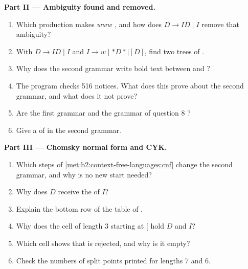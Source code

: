 \begin{problem}
\medskip\noindent\textbf{Part II --- Ambiguity found and removed.}\par\nopagebreak
\begin{enumerate}[resume, beginpenalty=10000]
\item Which production makes $www$ , and how does $D \to ID \mid I$ remove that ambiguity?
\item With $D \to ID \mid I$ and $I \to w \mid *D* \mid [D]$, find two trees of .
\item Why does the second grammar write bold text between \code{<} and \code{>}?
\item The program checks 516 notices. What does this prove about the second grammar, and what does it not prove?
\item Are the first grammar and the grammar of question 8 ?
\item Give a  of  in the second grammar.
\end{enumerate}

\medskip\noindent\textbf{Part III --- Chomsky normal form and CYK.}\par\nopagebreak
\begin{enumerate}[resume, beginpenalty=10000]
\item Which steps of \cref{met:b2:context-free-languages:cnf} change the second grammar, and why is no new start
needed?
\item Why does $D$ receive the  of $I$?
\item Explain the bottom row of the table of .
\item Why does the cell of length 3 starting at $[$ hold $D$ and $I$?
\item Which cell shows that  is rejected, and why is it empty?
\item Check the numbers of split points printed for lengths 7 and 6.
\end{enumerate}


\end{problem}
